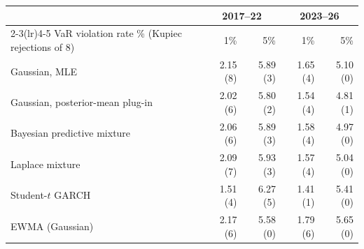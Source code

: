 \begin{tabular}{lrrrr}\toprule
 & \multicolumn{2}{c}{2017--22} & \multicolumn{2}{c}{2023--26}\\\cmidrule(lr){2-3}\cmidrule(lr){4-5}
VaR violation rate \% (Kupiec rejections of 8) & 1\% & 5\% & 1\% & 5\%\\\midrule
Gaussian, MLE & 2.15 (8) & 5.89 (3) & 1.65 (4) & 5.10 (0) \\
Gaussian, posterior-mean plug-in & 2.02 (6) & 5.80 (2) & 1.54 (4) & 4.81 (1) \\
Bayesian predictive mixture & 2.06 (6) & 5.89 (3) & 1.58 (4) & 4.97 (0) \\
Laplace mixture & 2.09 (7) & 5.93 (3) & 1.57 (4) & 5.04 (0) \\
Student-$t$ GARCH & 1.51 (4) & 6.27 (5) & 1.41 (1) & 5.41 (0) \\
EWMA (Gaussian) & 2.17 (6) & 5.58 (0) & 1.79 (6) & 5.65 (0) \\
\bottomrule\end{tabular}

